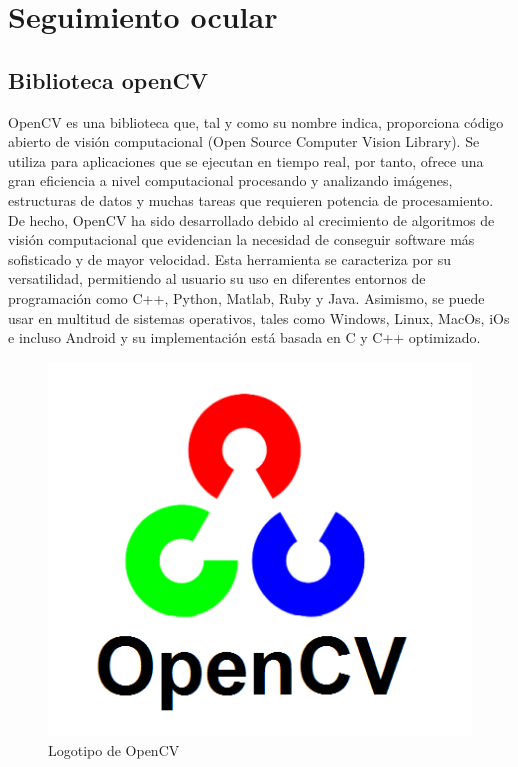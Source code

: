 \newpage
\section{Seguimiento ocular} \label{s2_2}

\subsection{Biblioteca openCV} \label{s2_2_1}

OpenCV es una biblioteca que, tal y como su nombre indica, proporciona código abierto de visión computacional (Open Source Computer Vision Library). Se utiliza para aplicaciones que se ejecutan en tiempo real, por tanto, ofrece una gran eficiencia a nivel computacional procesando y analizando imágenes, estructuras de datos y muchas tareas que requieren potencia de procesamiento. De hecho, OpenCV ha sido desarrollado debido al crecimiento de algoritmos de visión computacional que evidencian la necesidad de conseguir software más sofisticado y de mayor velocidad. 
Esta herramienta se caracteriza por su versatilidad, permitiendo al usuario su uso en diferentes entornos de programación como C++, Python, Matlab, Ruby y Java. Asimismo, se puede usar en multitud de sistemas operativos, tales como Windows, Linux, MacOs, iOs e incluso Android y su implementación está basada en C y C++ optimizado.

\begin{figure}
\centering
\includegraphics[scale = 0.5]{capitulo_02/figuras_dir/OpenCV.jpg}
\caption{Logotipo de OpenCV}
\end{figure}


